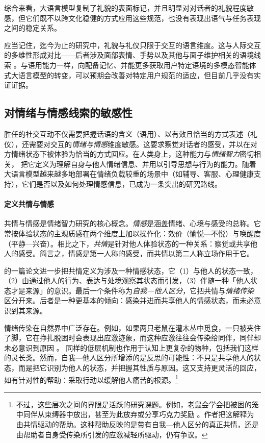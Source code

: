 综合来看，大语言模型复制了礼貌的表面标记，并且明显对对话者的礼貌程度敏感，但它们既不以跨文化稳健的方式应用这些规范，也没有表现出语气与任务表现之间的稳定关系。

应当记住，迄今为止的研究中，礼貌与礼仪只限于交互的语言维度。这与人际交互的多维性形成对比——后者涉及面部表情、手势以及其他与面子维护相关的语境线索%
\citep{brown1987politeness}。与语用能力一样，向配备记忆、并能更多获取用户特定语境的多模态智能体式大语言模型的转变，可以预期会改善对特定用户规范的适应，但目前几乎没有实证证据。

\subsection{对情绪与情感线索的敏感性} \label{sec:empathy}
胜任的社交互动不仅需要把握话语的含义（语用）、以有效且恰当的方式表述（礼仪），还需要对交互的\emph{情绪与情感}维度敏感。这要求察觉对话者的感受，并以在对方情绪状态下被体验为恰当的方式回应。在人类身上，这种能力与\emph{情绪智力}密切相关，\citet{salovey1990emotional} 把它定义为理解自身与他人情绪信息、并用以引导思想与行为的能力。随着大语言模型越来越多地部署在情绪负载较重的场景中（如辅导、客服、心理健康支持），它们是否以及如何处理情感信息，已成为一条突出的研究路线。

\paragraph{定义共情与情感}
共情与情感是情绪智力研究的核心概念。\emph{情感}是涵盖情绪、心境与感受的总称。它常按体验状态的主观质感在两个维度上加以操作化：效价（愉悦—不悦）与唤醒度（平静—兴奋）\citep{russell1980circumplex}。相比之下，\emph{共情}是针对他人体验状态的一种关系：察觉或共享他人的感受。简言之，情感是第一人称的感受，而共情以第二人称立场作用于它。

\citet{devignemont2006empathic} 的一篇论文进一步把共情定义为涉及一种情感状态，它（1）与他人的状态一致，（2）由通过他人的行为、表达与处境观察其状态而引发，（3）伴随一种「他人状态才是来源」的意识。最后一个条件称为\emph{自我—他人区分}，它把共情与\emph{情绪传染}区分开来。后者是一种更基本的倾向：感染并进而共享他人的情感状态，而未必意识到其来源。

情绪传染在自然界中广泛存在。例如，如果两只老鼠在灌木丛中觅食，一只被夹住了脚，它在挣扎脱困时会表现出应激迹象，而这种应激往往会传染给同伴，同伴却未必意识到原因 \citep{preston2002empathy}。
同样的低层机制也作用于认知上更复杂的物种，包括我们这样的灵长类。然而，自我—他人区分所增添的是反思的可能性：不只是共享他人的状态，而是把它识别为他人的状态，并把握其性质与原因。这又支持更灵活的回应，如有针对性的帮助：采取行动以缓解他人痛苦的根源。\footnote{不过，这些层次之间的界限是活跃的研究课题。例如，老鼠会学会把被困的笼中同伴从束缚器中放出，甚至为此放弃或分享巧克力奖励 \citep{bartal2011empathy}。作者把这解释为由共情驱动的帮助。这种帮助反映的是带有自我—他人区分的真正共情，还是由帮助者自身受传染所引发的应激减轻所驱动，仍有争议。}

